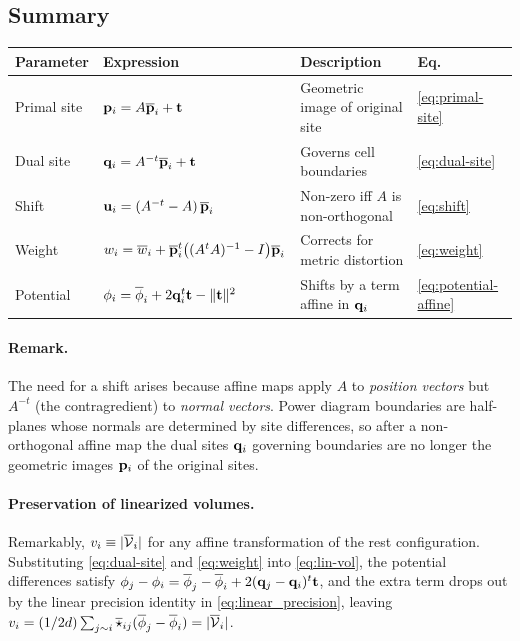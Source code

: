 \documentclass[11pt,a4paper]{article}
\begin{document}
\subsection{Summary}
\label{sec:affine_summary}
\begin{center}
\renewcommand{\arraystretch}{1.6}
\begin{tabular}{llll}
\toprule
\textbf{Parameter} & \textbf{Expression} & \textbf{Description} & \textbf{Eq.} \\
\midrule
Primal site & $\mathbf{p}_i = A\overline{\mathbf{p}}_i + \mathbf{t}$ & Geometric image of original site & \eqref{eq:primal-site}\\
Dual site   & $\mathbf{q}_i = A^{-t}\overline{\mathbf{p}}_i + \mathbf{t}$ & Governs cell boundaries & \eqref{eq:dual-site}\\
Shift       & $\mathbf{u}_i = (A^{-t} - A)\,\overline{\mathbf{p}}_i$ & Non-zero iff $A$ is non-orthogonal & \eqref{eq:shift}\\
Weight      & $w_i = \overline{w}_i + \overline{\mathbf{p}}_i^t\bigl((A^tA)^{-1} - I\bigr)\overline{\mathbf{p}}_i$ & Corrects for metric distortion & \eqref{eq:weight}\\
Potential   & $\phi_i = \overline{\phi}_i + 2\mathbf{q}_i^t\mathbf{t} - \|\mathbf{t}\|^2$ & Shifts by a term affine in $\mathbf{q}_i$ & \eqref{eq:potential-affine}\\
\bottomrule
\end{tabular}
\end{center}

\paragraph{Remark.} The need for a shift arises because affine maps apply $A$ to \emph{position vectors} but $A^{-t}$ (the contragredient) to \emph{normal vectors}. Power diagram boundaries are half-planes whose normals are determined by site differences, so after a non-orthogonal affine map the dual sites $\mathbf{q}_i$ governing boundaries are no longer the geometric images $\mathbf{p}_i$ of the original sites.

\paragraph{Preservation of linearized volumes.}
Remarkably, $v_i \equiv |\overline{\mathcal{V}}_i|$ for any affine transformation of the rest configuration.
Substituting \eqref{eq:dual-site} and \eqref{eq:weight} into \eqref{eq:lin-vol}, the potential differences satisfy $\phi_j - \phi_i = \overline{\phi}_j - \overline{\phi}_i + 2(\mathbf{q}_j - \mathbf{q}_i)^t\mathbf{t}$, and the extra term drops out by the linear precision identity in \eqref{eq:linear_precision}, leaving $v_i = (1/2d) \sum_{j\sim i}\overline{\star}_{ij}(\overline{\phi}_j - \overline{\phi}_i) = |\overline{\mathcal{V}}_i|$.
\end{document}
